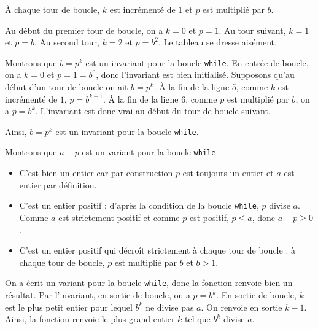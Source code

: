 \exer{}
\setcounter{numques}{0}

\question{} À chaque tour de boucle, $k$ est incrémenté de $1$ et $p$ est multiplié par $b$.

Au début du premier tour de boucle, on a $k=0$ et $p=1$. Au tour suivant, $k=1$ et $p = b$. Au second tour, $k=2$ et $p=b^2$. Le tableau se dresse aisément.

\question{} Montrons que \og $b = p^k$ \fg{} est un invariant pour la boucle \texttt{while}. En entrée de boucle, on a $k=0$ et $p=1=b^0$, donc l'invariant est bien initialisé.
Supposons qu'au début d'un tour de boucle on ait $b = p^k$. À la fin de la ligne 5, comme $k$ est incrémenté de $1$, $p = b^{k-1}$. À la fin de la ligne 6, comme $p$ est multiplié par $b$, on a $p = b^k$.
L'invariant est donc vrai au début du tour de boucle suivant.

Ainsi, \og $b = p^k$ \fg{} est un invariant pour la boucle \texttt{while}.

\question{} Montrons que \og $a - p$ \fg{} est un variant pour la boucle \texttt{while}. 
\begin{itemize}
    \item C'est bien un entier car par construction $p$ est toujours un entier et $a$ est entier par définition. 
    \item C'est un entier positif : d'après la condition de la boucle \texttt{while}, $p$ divise $a$. Comme $a$ est strictement positif et comme $p$ est positif, $p \leq a$, donc $a-p\geq 0$. 
    \item C'est un entier positif qui décroît strictement à chaque tour de boucle : à chaque tour de boucle, $p$ est multiplié par $b$ et $b>1$. 
\end{itemize}

\question{} On a écrit un variant pour la boucle \texttt{while}, donc la fonction renvoie bien un résultat. Par l'invariant, en sortie de boucle, on a $p = b^k$. 
En sortie de boucle, $k$ est le plus petit entier pour lequel $b^k$ ne divise pas $a$. On renvoie en sortie $k-1$. Ainsi, la fonction renvoie le plus grand entier $k$ tel que $b^k$ divise $a$. 


